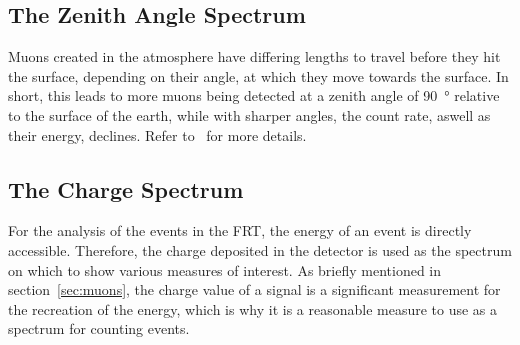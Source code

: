 \subsection{The Zenith Angle Spectrum}
Muons created in the atmosphere have differing lengths to travel before they hit the surface, depending on their angle, at which they move towards the surface. 
In short, this leads to more muons being detected at a zenith angle of \SI{90}{\degree} relative to the surface of the earth, while with sharper angles, the 
count rate, aswell as their energy, declines. Refer to~\cite{einstein} for more details. 

\subsection{The Charge Spectrum}
For the analysis of the events in the FRT, the energy of an event is directly accessible. Therefore, the charge deposited in the detector is used as the 
spectrum on which to show various measures of interest. As briefly mentioned in section~\ref{sec:muons}, the charge value of a signal is a significant 
measurement for the recreation of the energy, which is why it is a reasonable measure to use as a spectrum for counting events. 
